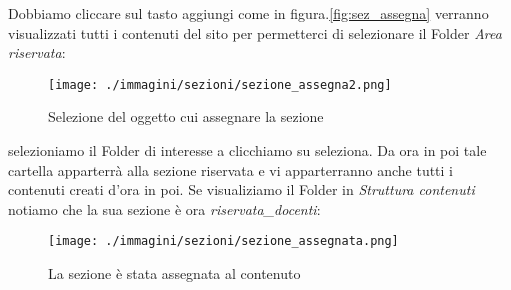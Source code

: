 Dobbiamo cliccare sul tasto aggiungi come in figura.\ref{fig:sez_assegna} verranno visualizzati tutti i contenuti del sito per permetterci di selezionare il Folder \textsl{Area riservata}:
\begin{figure}[H]
 \centering
 \texttt{[image: ./immagini/sezioni/sezione\_assegna2.png]}
 \caption{Selezione del oggetto cui assegnare la sezione}
 \label{fig:sez_asegna2}
\end{figure}

selezioniamo il Folder di interesse a clicchiamo su seleziona. Da ora in poi tale cartella apparterrà alla sezione riservata e vi apparterranno anche tutti i contenuti creati d'ora in poi.
Se visualiziamo il Folder  in \textsl{Struttura contenuti} notiamo che la sua sezione è ora \textsl{riservata\_docenti}:
\begin{figure}[H]
 \centering
 \texttt{[image: ./immagini/sezioni/sezione\_assegnata.png]}
 \caption{La sezione è stata assegnata al contenuto}
 \label{fig:sez_assegnata}
\end{figure}















